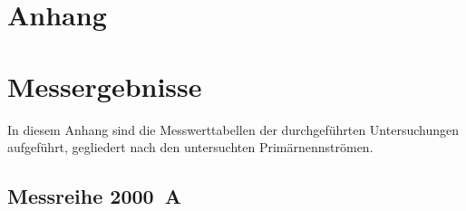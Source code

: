 

\section*{Anhang}



\section{Messergebnisse}
\label{chap:anhang_content}

In diesem Anhang sind die Messwerttabellen der durchgeführten Untersuchungen aufgeführt, gegliedert nach den untersuchten Primärnennströmen.

\subsection{Messreihe \SI{2000}{A}}
\label{sec:anhang_2000A}

